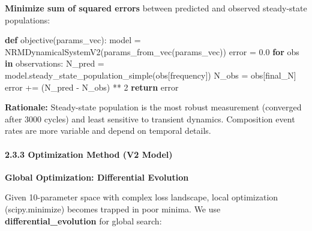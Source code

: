 \documentclass[
]{article}
\newenvironment{Shaded}{}{}
\newcommand{\ControlFlowTok}[1]{\textcolor[rgb]{0.00,0.44,0.13}{\textbf{#1}}}
\newcommand{\DecValTok}[1]{\textcolor[rgb]{0.25,0.63,0.44}{#1}}
\newcommand{\FloatTok}[1]{\textcolor[rgb]{0.25,0.63,0.44}{#1}}
\newcommand{\KeywordTok}[1]{\textcolor[rgb]{0.00,0.44,0.13}{\textbf{#1}}}
\newcommand{\NormalTok}[1]{#1}
\newcommand{\OperatorTok}[1]{\textcolor[rgb]{0.40,0.40,0.40}{#1}}
\newcommand{\StringTok}[1]{\textcolor[rgb]{0.25,0.44,0.63}{#1}}
\begin{document}
\textbf{Minimize sum of squared errors} between predicted and observed
steady-state populations:

\begin{Shaded}
\begin{Highlighting}[]
\KeywordTok{def}\NormalTok{ objective(params\_vec):}
\NormalTok{    model }\OperatorTok{=}\NormalTok{ NRMDynamicalSystemV2(params\_from\_vec(params\_vec))}
\NormalTok{    error }\OperatorTok{=} \FloatTok{0.0}
    \ControlFlowTok{for}\NormalTok{ obs }\KeywordTok{in}\NormalTok{ observations:}
\NormalTok{        N\_pred }\OperatorTok{=}\NormalTok{ model.steady\_state\_population\_simple(obs[}\StringTok{\textquotesingle{}frequency\textquotesingle{}}\NormalTok{])}
\NormalTok{        N\_obs }\OperatorTok{=}\NormalTok{ obs[}\StringTok{\textquotesingle{}final\_N\textquotesingle{}}\NormalTok{]}
\NormalTok{        error }\OperatorTok{+=}\NormalTok{ (N\_pred }\OperatorTok{{-}}\NormalTok{ N\_obs) }\OperatorTok{**} \DecValTok{2}
    \ControlFlowTok{return}\NormalTok{ error}
\end{Highlighting}
\end{Shaded}

\textbf{Rationale:} Steady-state population is the most robust
measurement (converged after 3000 cycles) and least sensitive to
transient dynamics. Composition event rates are more variable and depend
on temporal details.

\paragraph{2.3.3 Optimization Method (V2
Model)}\label{optimization-method-v2-model}

\textbf{Global Optimization: Differential Evolution}

Given 10-parameter space with complex loss landscape, local optimization
(scipy.minimize) becomes trapped in poor minima. We use
\textbf{differential\_evolution} for global search:
\end{document}
